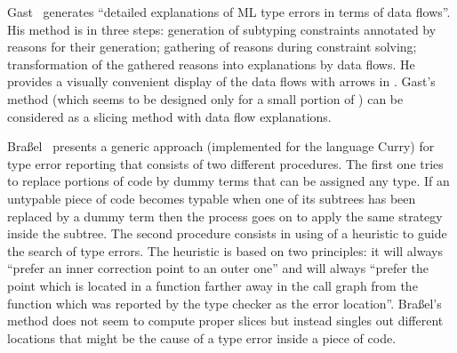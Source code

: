 \documentclass{jfp1}
\newcommand{\brael}{Bra{\ss}el}
\begin{document}


Gast~\cite{Gast:2004} generates ``detailed explanations of ML
type errors in terms of data flows''.  His method is in three steps:
%
generation of subtyping constraints annotated by reasons for their
generation;
%
%
gathering of reasons during constraint solving; %
%
transformation of the gathered reasons into explanations by data
flows.
%
He provides
a visually convenient display of
the data flows with arrows in \XEMACS.  Gast's method (which seems to
be designed only for a small portion of \OCAML) can be considered as a
slicing method with
data flow explanations.

\brael~\cite{Brael:2004} presents a generic approach
(implemented for the language Curry) for type error reporting
that consists of two different procedures.  The first one
tries to replace portions of code by dummy terms that can
be assigned any type.  If an untypable piece of code becomes typable
when one of its subtrees has been replaced by a dummy term then the
process goes on to apply the same strategy inside the subtree.  The
second procedure consists in using of a heuristic to guide the
search of type errors.  The heuristic is based on two principles: it
will always ``prefer an inner correction point to an outer one'' and
will always ``prefer the point which is located in a function farther
away in the call graph from the function which was reported by the
type checker as the error location''.
\brael's method does not seem to compute proper slices but instead
singles out different locations that might be the cause of a type
error inside a piece of code.







\end{document}
